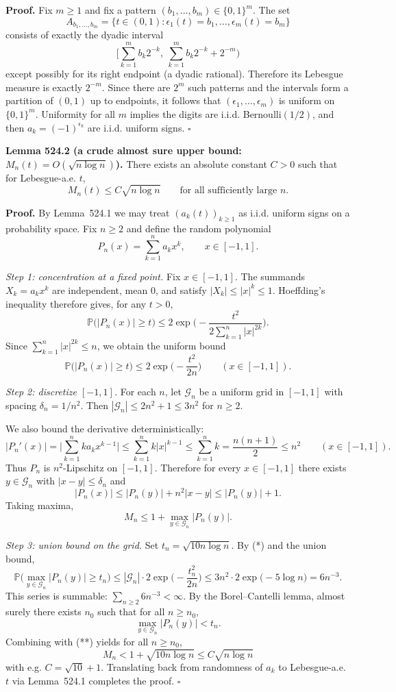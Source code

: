 \noindent\textbf{Proof.}
Fix $m\ge 1$ and fix a pattern $(b_1,\dots,b_m)\in\{0,1\}^m$. The set
\[A_{b_1,\dots,b_m}=\{t\in(0,1): \epsilon_1(t)=b_1,\dots,\epsilon_m(t)=b_m\}
\]
consists of exactly the dyadic interval
\[\Big[\sum_{k=1}^m b_k 2^{-k},\ \sum_{k=1}^m b_k 2^{-k}+2^{-m}\Big)
\]
except possibly for its right endpoint (a dyadic rational). Therefore its Lebesgue measure is exactly $2^{-m}$.
Since there are $2^m$ such patterns and the intervals form a partition of $(0,1)$ up to endpoints, it follows that $(\epsilon_1,\dots,\epsilon_m)$ is uniform on $\{0,1\}^m$.
Uniformity for all $m$ implies the digits are i.i.d. Bernoulli$(1/2)$, and then $a_k=(-1)^{\epsilon_k}$ are i.i.d. uniform signs.
\hfill$\square$

\medskip
\noindent\textbf{Lemma 524.2 (a crude almost sure upper bound: $M_n(t)=O(\sqrt{n\log n})$).}
There exists an absolute constant $C>0$ such that for Lebesgue-a.e. $t$,
\[M_n(t) \le C\sqrt{n\log n}\qquad\text{for all sufficiently large }n.
\]

\noindent\textbf{Proof.}
By Lemma~524.1 we may treat $(a_k(t))_{k\ge 1}$ as i.i.d. uniform signs on a probability space.
Fix $n\ge 2$ and define the random polynomial
\[P_n(x)=\sum_{k=1}^n a_k x^k,\qquad x\in[-1,1].
\]

\emph{Step 1: concentration at a fixed point.}
Fix $x\in[-1,1]$. The summands $X_k=a_k x^k$ are independent, mean $0$, and satisfy $|X_k|\le |x|^k\le 1$.
Hoeffding's inequality therefore gives, for any $t>0$,
\[\mathbb P\big(|P_n(x)|\ge t\big) \le 2\exp\Big(-\frac{t^2}{2\sum_{k=1}^n |x|^{2k}}\Big).
\]
Since $\sum_{k=1}^n |x|^{2k}\le n$, we obtain the uniform bound
\[\mathbb P\big(|P_n(x)|\ge t\big) \le 2\exp\Big(-\frac{t^2}{2n}\Big)\qquad (x\in[-1,1]). \tag{*}
\]

\emph{Step 2: discretize $[-1,1]$.}
For each $n$, let $\mathcal G_n$ be a uniform grid in $[-1,1]$ with spacing $\delta_n=1/n^2$.
Then $|\mathcal G_n|\le 2n^2+1\le 3n^2$ for $n\ge 2$.

We also bound the derivative deterministically:
\[|P_n'(x)| = \Big|\sum_{k=1}^n k a_k x^{k-1}\Big| \le \sum_{k=1}^n k |x|^{k-1} \le \sum_{k=1}^n k = \frac{n(n+1)}{2} \le n^2\qquad (x\in[-1,1]).\]
Thus $P_n$ is $n^2$-Lipschitz on $[-1,1]$.
Therefore for every $x\in[-1,1]$ there exists $y\in\mathcal G_n$ with $|x-y|\le\delta_n$ and
\[|P_n(x)|\le |P_n(y)| + n^2|x-y| \le |P_n(y)|+1.
\]
Taking maxima,
\[M_n\le 1 + \max_{y\in\mathcal G_n} |P_n(y)|.\tag{**}
\]

\emph{Step 3: union bound on the grid.}
Set $t_n=\sqrt{10 n\log n}$. By (*) and the union bound,
\[\mathbb P\Big(\max_{y\in\mathcal G_n}|P_n(y)|\ge t_n\Big)
\le |\mathcal G_n|\cdot 2\exp\Big(-\frac{t_n^2}{2n}\Big)
\le 3n^2\cdot 2\exp\big(-5\log n\big)
=6 n^{-3}.
\]
This series is summable: $\sum_{n\ge 2} 6n^{-3}<\infty$.
By the Borel--Cantelli lemma, almost surely there exists $n_0$ such that for all $n\ge n_0$,
\[\max_{y\in\mathcal G_n}|P_n(y)|<t_n.
\]
Combining with (**) yields for all $n\ge n_0$,
\[M_n < 1 + \sqrt{10 n\log n} \le C\sqrt{n\log n}
\]
with e.g. $C=\sqrt{10}+1$.
Translating back from randomness of $a_k$ to Lebesgue-a.e. $t$ via Lemma~524.1 completes the proof.
\hfill$\square$

